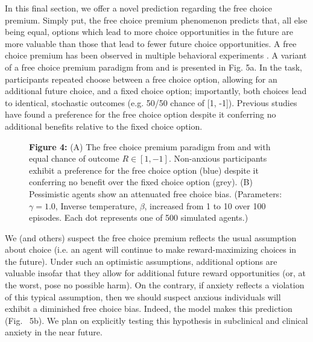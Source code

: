 \documentclass[11pt]{article} %
\begin{document}
In this final section, we offer a novel prediction regarding the free choice premium. Simply put, the free choice premium phenomenon predicts that, all else being equal, options which lead to more choice opportunities in the future are more valuable than those that lead to fewer future choice opportunities. A free choice premium has been observed in multiple behavioral experiments \cite{Leotti2010, ly2019}. A variant of a free choice premium paradigm from \cite{Leotti2011} and \cite{Leotti2014} is presented in Fig. 5a. In the task, participants repeated choose between a free choice option, allowing for an additional future choice, and a fixed choice option; importantly, both choices lead to identical, stochastic outcomes (e.g. 50/50 chance of [1, -1]). Previous studies have found a preference for the free choice option despite it conferring no additional benefits relative to the fixed choice option. 

\begin{figure}[!b]
  \centerline{%
  }
  \par \textbf{Figure 4:} (A) The free choice premium paradigm from \cite{Leotti2011} and \cite{Leotti2014} with equal chance of outcome $R \in [1, -1]$. Non-anxious participants exhibit a preference for the free choice option (blue) despite it conferring no benefit over the fixed choice option (grey). (B) Pessimistic agents show an attenuated free choice bias. (Parameters: $\gamma = 1.0$, Inverse temperature, $\beta$, increased from 1 to 10 over 100 episodes. Each dot represents one of 500 simulated agents.)
\end{figure}

We (and others)\citep{ly2019} suspect the free choice premium reflects the usual assumption about choice (i.e. an agent will continue to make reward-maximizing choices in the future). Under such an optimistic assumptions, additional options are valuable insofar that they allow for additional future reward opportunities (or, at the worst, pose no possible harm). On the contrary, if anxiety reflects a violation of this typical assumption, then we should suspect anxious individuals will exhibit a diminished free choice bias. Indeed, the model makes this prediction (Fig. ~5b). We plan on explicitly testing this hypothesis in subclinical and clinical anxiety in the near future.
\end{document}
